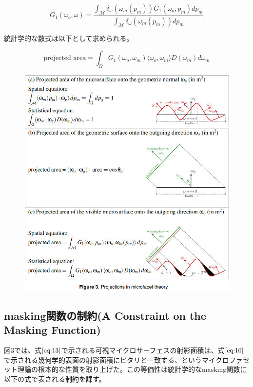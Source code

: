 \documentclass[a4j,xelatex,ja=standard]{bxjsarticle}
\begin{document}
\begin{equation}
    G_1(\omega_o, \omega) = \frac{\int_\mathcal{M}\delta_{\omega}(\omega_m(p_m))G_1(\omega_o, p_m)dp_m}{\int_\mathcal{M}\delta_{\omega}(\omega_m(p_m))dp_m}
    \label{eq:12}
\end{equation}

統計学的な数式は以下として求められる。

\begin{equation}
    \text{projected area} = \int_\Omega G_1(\omega_o, \omega_m) \langle \omega_o, \omega_m \rangle D(\omega_m) d\omega_m
    \label{eq:13}
\end{equation}

\begin{figure}
    \includegraphics[width=\textwidth]{Figure3.png}
    \caption{}
    \label{fig:3}
\end{figure}

\subsection{masking関数の制約(A Constraint on the Masking Function)}

図3では、式$\eqref{eq:13}$で示される可視マイクロサーフェスの射影面積は、式$\eqref{eq:10}$で示される幾何学的表面の射影面積にピタリと一致する、というマイクロファセット理論の根本的な性質を取り上げた。この等価性は統計学的なmasking関数に以下の式で表される制約を課す。
\end{document}
